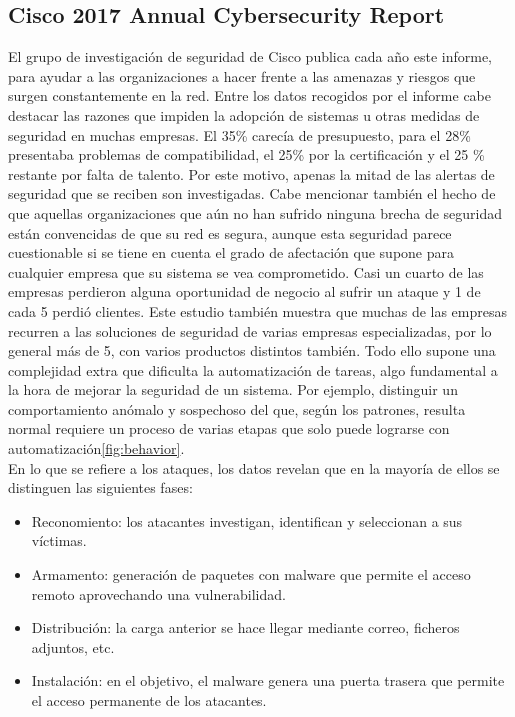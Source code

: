 \subsection{Cisco 2017 Annual Cybersecurity Report}
El grupo de investigación de seguridad de Cisco publica cada año este informe, para ayudar a las organizaciones a hacer frente a las amenazas y riesgos que surgen constantemente en la red. Entre los datos recogidos por el informe cabe destacar las razones que impiden la adopción de sistemas u otras medidas de seguridad en muchas empresas. El 35\% carecía de presupuesto, para el 28\% presentaba problemas de compatibilidad, el 25\% por la certificación y el 25 \% restante por falta de talento. Por este motivo, apenas la mitad de las alertas de seguridad que se reciben son investigadas. Cabe mencionar también el hecho de que aquellas organizaciones que aún no han sufrido ninguna brecha de seguridad están convencidas de que su red es segura, aunque esta seguridad parece cuestionable si se tiene en cuenta el grado de afectación que supone para cualquier empresa que su sistema se vea comprometido. Casi un cuarto de las empresas perdieron alguna oportunidad de negocio al sufrir un ataque y 1 de cada 5 perdió clientes. Este estudio también muestra que muchas de las empresas recurren a las soluciones de seguridad de varias empresas especializadas, por lo general más de 5, con varios productos distintos también. Todo ello supone una complejidad extra que dificulta la automatización de tareas, algo fundamental a la hora de mejorar la seguridad de un sistema. Por ejemplo, distinguir un comportamiento anómalo y sospechoso del que, según los patrones, resulta normal requiere un proceso de varias etapas que solo puede lograrse con automatización\ref{fig:behavior}.\\
En lo que se refiere a los ataques, los datos revelan que en la mayoría de ellos se distinguen las siguientes fases:
\begin{itemize}
	\item Reconomiento: los atacantes investigan, identifican y seleccionan a sus víctimas.
	\item Armamento: generación de paquetes con malware que permite el acceso remoto aprovechando una vulnerabilidad.
	\item Distribución: la carga anterior se hace llegar mediante correo, ficheros adjuntos, etc.
	\item Instalación: en el objetivo, el malware genera una puerta trasera que permite el acceso permanente de los atacantes.
\end{itemize}
